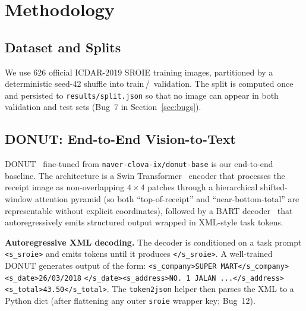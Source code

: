 \section{Methodology}
\label{sec:method}

\subsection{Dataset and Splits}
\label{sec:data_splits}
We use 626 official ICDAR-2019 SROIE training images, partitioned by
a deterministic seed-42 shuffle into
 train\,/\, validation.
  The split is computed
once and persisted to \texttt{results/split.json} so that no image
can appear in both validation and test sets (Bug~7 in
Section~\ref{sec:bugs}).

\subsection{DONUT: End-to-End Vision-to-Text}

DONUT~\cite{kim2022donut} fine-tuned from \texttt{naver-clova-ix/donut-base}
is our end-to-end baseline.  The architecture is a Swin
Transformer~\cite{liu2021swin} encoder that processes the receipt image
as non-overlapping $4{\times}4$ patches through a hierarchical
shifted-window attention pyramid (so both ``top-of-receipt'' and
``near-bottom-total'' are representable without explicit coordinates),
followed by a BART decoder~\cite{lewis2020bart} that
autoregressively emits structured output wrapped in XML-style task tokens.

\textbf{Autoregressive XML decoding.}
The decoder is conditioned on a task prompt
\texttt{<s\_sroie>} and emits tokens until it produces
\texttt{</s\_sroie>}.  A well-trained DONUT generates output of the form:
\texttt{<s\_company>SUPER MART</s\_company><s\_date>26/03/2018}
\texttt{</s\_date><s\_address>NO.~1 JALAN~...</s\_address>}
\texttt{<s\_total>43.50</s\_total>}.
The \texttt{token2json} helper then parses the XML to a Python dict
(after flattening any outer \texttt{sroie} wrapper key; Bug~12).

